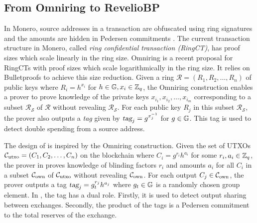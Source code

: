\vspace{-2pt}
\subsection{From Omniring to \textnormal{{\selectfont RevelioBP}}}
In Monero, source addresses in a transaction are obfuscated using ring signatures and the amounts are hidden in Pedersen commitments \cite{Noether2016}. 
The current transaction structure in Monero, called \textit{ring confidential transaction (RingCT)}, has proof sizes which scale linearly in the ring size. Omniring \cite{Lai2019} is a recent proposal for RingCTs with proof sizes which scale logarithmically in the ring size. It relies on Bulletproofs \cite{Bunz2018} to achieve this size reduction. Given a ring $\mathcal{R} = (R_1, R_2,\ldots,R_n)$ of public keys where $R_i = h^{x_i}$ for $h \in \mathbb{G}, x_i \in \mathbb{Z}_q$, the Omniring construction enables a prover to prove knowledge of the private keys $x_{i_1}, x_{i_2},\ldots,x_{i_m}$ corresponding to a subset $\mathcal{R}_{\mathcal{S}}$ of $\mathcal{R}$ without revealing $\mathcal{R}_{\mathcal{S}}$. For each public key $R_j$ in this subset $\mathcal{R}_{\mathcal{S}}$, the prover also outputs a \textit{tag} given by $\textsl{tag}_j = g^{x_j^{-1}}$ for $g \in \mathbb{G}$. This tag is used to detect double spending from a source address.

The design of \RB is inspired by the Omniring construction. Given the set of UTXOs $\mathcal{C}_{\text{utxo}}=(C_1,C_2,\ldots,C_n)$ on the blockchain where $C_i = g^{r_i}h^{a_i}$ for some $r_i, a_i \in \mathbb{Z}_q$, the prover in \RPlus proves knowledge of blinding factors $r_i$ and amounts $a_i$ for all $C_i$ in a subset $\mathcal{C}_{\text{own}}$ of $\mathcal{C}_{\text{utxo}}$ without revealing $\mathcal{C}_{\text{own}}$. For each output $C_j \in \mathcal{C}_{\text{own}}$, the prover outputs a tag $\textsl{tag}_j = g_t^{r_j}h^{a_j}$ where $g_t \in \mathbb{G}$ is a randomly chosen group element. In \Rplus, the tag has a dual role. Firstly, it is used to detect output sharing between exchanges. Secondly, the product of the tags is a Pedersen commitment to the total reserves of the exchange.

